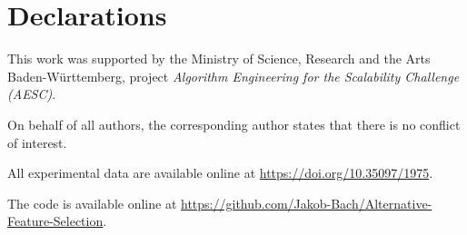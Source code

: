 \documentclass[iicol, sn-basic, Numbered]{sn-jnl} %
\theoremstyle{plain}
\theoremstyle{definition}
\begin{document}
\section*{Declarations}


This work was supported by the Ministry of Science, Research and the Arts Baden-W\"urttemberg, project \emph{Algorithm Engineering for the Scalability Challenge (AESC)}.


On behalf of all authors, the corresponding author states that there is no conflict of interest.


All experimental data are available online at \url{https://doi.org/10.35097/1975}.


The code is available online at \url{https://github.com/Jakob-Bach/Alternative-Feature-Selection}.
\end{document}
